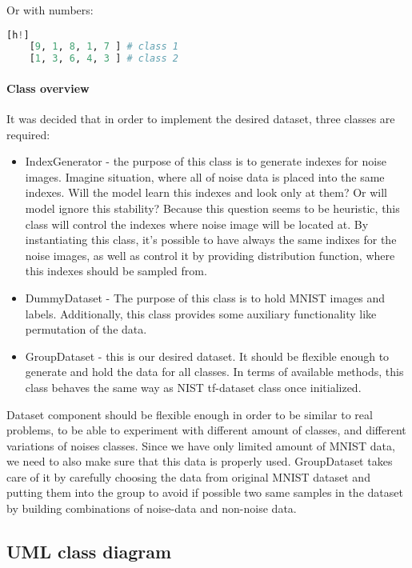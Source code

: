 Or with numbers:
\begin{lstlisting}[language=Python][h!]
	[9, 1, 8, 1, 7 ] # class 1
	[1, 3, 6, 4, 3 ] # class 2
\end{lstlisting}



\paragraph{Class overview}

It was decided that in order to implement
the desired dataset, three classes are required:
\begin{itemize}
	\item IndexGenerator - the purpose of this class is to generate indexes for
		noise images. Imagine situation, where all of noise data is placed into
		the same indexes. Will the model learn this indexes and look only at
		them? Or will model ignore this stability? Because this question seems
		to be heuristic, this class will control the indexes where noise image
		will be located at. By instantiating this class, it's possible to have
		always the same indixes for the noise images, as well as control it by
		providing distribution function, where this indexes should be sampled from.
	\item DummyDataset - The purpose of this class is to hold MNIST images
		and labels. Additionally, this class provides some auxiliary functionality
		like permutation of the data.
	\item GroupDataset - this is our desired dataset. It should be flexible
		enough to generate and hold the data for all classes. In terms of
		available methods, this class behaves the same way as NIST tf-dataset class
		once initialized.
\end{itemize}

Dataset component should be flexible enough in order to be similar to real problems,
to be able to experiment with different amount of classes, and
different variations of noises classes. Since we have only limited amount of MNIST data,
we need to also make sure that this data is properly used. GroupDataset takes
care of it by carefully choosing the data from original MNIST dataset and putting
them into the group to avoid if possible two same samples in the dataset by building
combinations of noise-data and non-noise data.

\subsection{UML class diagram}

